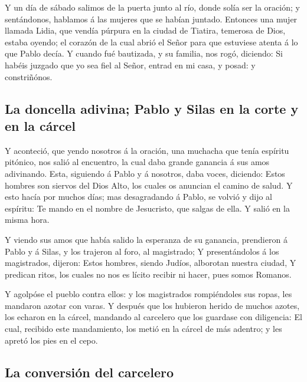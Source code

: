  Y un día de sábado salimos de la puerta junto al río,
donde solía ser la oración; y sentándonos, hablamos á las mujeres que se
habían juntado.  Entonces una mujer llamada Lidia, que
vendía púrpura en la ciudad de Tiatira, temerosa de Dios, estaba oyendo;
el corazón de la cual abrió el Señor para que estuviese atenta á lo que
Pablo decía.  Y cuando fué bautizada, y su familia, nos
rogó, diciendo: Si habéis juzgado que yo sea fiel al Señor, entrad en mi
casa, y posad: y constriñónos.

\hypertarget{la-doncella-adivina-pablo-y-silas-en-la-corte-y-en-la-cuxe1rcel}{%
\subsection{La doncella adivina; Pablo y Silas en la corte y en la
cárcel}\label{la-doncella-adivina-pablo-y-silas-en-la-corte-y-en-la-cuxe1rcel}}

 Y aconteció, que yendo nosotros á la oración, una muchacha
que tenía espíritu pitónico, nos salió al encuentro, la cual daba grande
ganancia á sus amos adivinando.  Esta, siguiendo á Pablo y
á nosotros, daba voces, diciendo: Estos hombres son siervos del Dios
Alto, los cuales os anuncian el camino de salud.  Y esto
hacía por muchos días; mas desagradando á Pablo, se volvió y dijo al
espíritu: Te mando en el nombre de Jesucristo, que salgas de ella. Y
salió en la misma hora.

 Y viendo sus amos que había salido la esperanza de su
ganancia, prendieron á Pablo y á Silas, y los trajeron al foro, al
magistrado;  Y presentándolos á los magistrados, dijeron:
Estos hombres, siendo Judíos, alborotan nuestra ciudad,  Y
predican ritos, los cuales no nos es lícito recibir ni hacer, pues somos
Romanos.

 Y agolpóse el pueblo contra ellos: y los magistrados
rompiéndoles sus ropas, les mandaron azotar con varas.  Y
después que los hubieron herido de muchos azotes, los echaron en la
cárcel, mandando al carcelero que los guardase con diligencia:
 El cual, recibido este mandamiento, los metió en la cárcel
de más adentro; y les apretó los pies en el cepo.

\hypertarget{la-conversiuxf3n-del-carcelero}{%
\subsection{La conversión del
carcelero}\label{la-conversiuxf3n-del-carcelero}}

